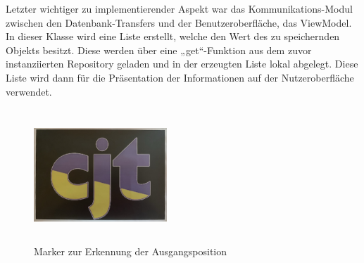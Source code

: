 Letzter wichtiger zu implementierender Aspekt war das Kommunikations-Modul zwischen den Datenbank-Transfers und der Benutzeroberfläche, das ViewModel. 
In dieser Klasse wird eine Liste erstellt, welche den Wert des zu speichernden Objekts besitzt. Diese werden über eine „get“-Funktion aus dem zuvor 
instanziierten Repository geladen und in der erzeugten Liste lokal abgelegt. Diese Liste wird dann für die Präsentation der Informationen auf der 
Nutzeroberfläche verwendet. 
\begin{figure}[hbt!]
    \centering
    \includegraphics[width=5cm,height=5cm,keepaspectratio]{4Umsetzung/Bilder/cjt_logo_tracking.png}
    \caption{Marker zur Erkennung der Ausgangsposition}
    \label{pic:initialMarker}
\end{figure}
